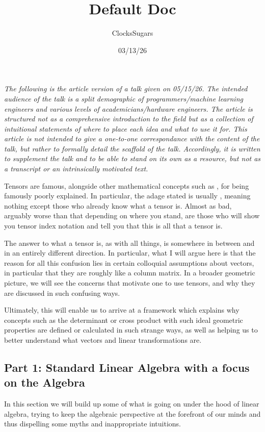 \documentclass[11pt]{article}
\title{\textbf{Default Doc}}
\author{ClocksSugars}
\date{03/13/26}
\begin{document}
\emph{The following is the article version of a talk given on 05/15/26. The intended audience of the talk is a split demographic of programmers/machine learning engineers and various levels of academicians/hardware engineers. The article is structured not as a comprehensive introduction to the field but as a collection of intuitional statements of where to place each idea and what to use it for. This article is not intended to give a one-to-one correspondance with the content of the talk, but rather to formally detail the scaffold of the talk. Accordingly, it is written to supplement the talk and to be able to stand on its own as a resource, but not as a transcript or an intrinsically motivated text.}

Tensors are famous, alongside other mathematical concepts such as , for being famously poorly explained. In particular, the adage stated is usually , meaning nothing except those who already know what a tensor is. Almost as bad, arguably worse than that depending on where you stand, are those who will show you tensor index notation and tell you that this is all that a tensor is.

The answer to what a tensor is, as with all things, is somewhere in between and in an entirely different direction. In particular, what I will argue here is that the reason for all this confusion lies in certain colloquial assumptions about vectors, in particular that they are roughly like a column matrix. In a broader geometric picture, we will see the concerns that motivate one to use tensors, and why they are discussed in such confusing ways.

Ultimately, this will enable us to arrive at a framework which explains why concepts such as the determinant or cross product with such ideal geometric properties are defined or calculated in such strange ways, as well as helping us to better understand what vectors and linear transformations are.

\subsection{Part 1: Standard Linear Algebra with a focus on the Algebra}

In this section we will build up some of what is going on under the hood of linear algebra, trying to keep the algebraic perspective at the forefront of our minds and thus dispelling some myths and inappropriate intuitions.
\end{document}
